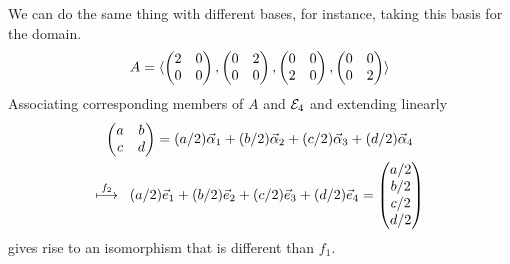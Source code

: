 \begin{example}
We can do the same thing with different bases, 
for instance, taking this basis for the domain.
\begin{equation*}
  A=\langle
              \begin{pmatrix}
                2  &0  \\
                0  &0
              \end{pmatrix},
              \begin{pmatrix}
                0  &2  \\
                0  &0
              \end{pmatrix},
              \begin{pmatrix}
                0  &0  \\
                2  &0
              \end{pmatrix},
              \begin{pmatrix}
                0  &0  \\
                0  &2
              \end{pmatrix} \rangle
\end{equation*}
Associating corresponding members of $A$ and ${\cal E}_4$ and extending
linearly
\begin{multline*}
  \begin{pmatrix}
    a  &b  \\
    c  &d
  \end{pmatrix}
  =(a/2)\vec{\alpha}_1+(b/2)\vec{\alpha}_2
      +(c/2)\vec{\alpha}_3+(d/2)\vec{\alpha}_4          \\
  \stackrel{f_2}{\longmapsto}\;\;
  (a/2)\vec{e}_1+(b/2)\vec{e}_2+(c/2)\vec{e}_3+(d/2)\vec{e}_4
  =\begin{pmatrix} a/2 \\ b/2 \\ c/2 \\ d/2 \end{pmatrix}
\end{multline*}
gives rise to an isomorphism that is different than $f_1$.


\end{example}
